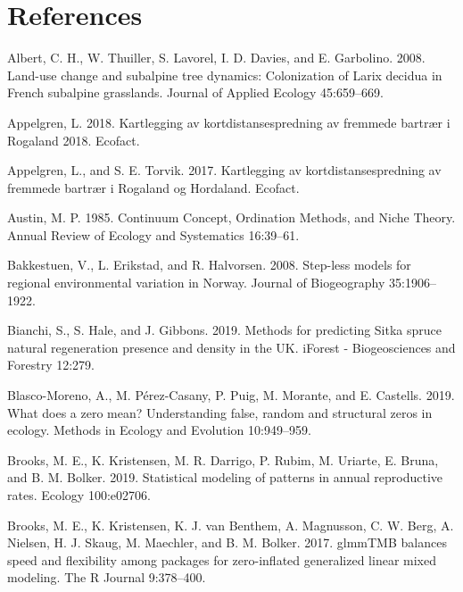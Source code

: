 \documentclass[
]{article}
\begin{document}
\hypertarget{references}{%
\section*{References}\label{references}}

\hypertarget{refs}{}
\leavevmode\hypertarget{ref-albertLanduseChangeSubalpine2008}{}%
Albert, C. H., W. Thuiller, S. Lavorel, I. D. Davies, and E. Garbolino. 2008. Land-use change and subalpine tree dynamics: Colonization of Larix decidua in French subalpine grasslands. Journal of Applied Ecology 45:659--669.

\leavevmode\hypertarget{ref-appelgrenKartleggingAvKortdistansespredning2018}{}%
Appelgren, L. 2018. Kartlegging av kortdistansespredning av fremmede bartrær i Rogaland 2018. Ecofact.

\leavevmode\hypertarget{ref-appelgrenKartleggingAvKortdistansespredning2017}{}%
Appelgren, L., and S. E. Torvik. 2017. Kartlegging av kortdistansespredning av fremmede bartrær i Rogaland og Hordaland. Ecofact.

\leavevmode\hypertarget{ref-austinContinuumConceptOrdination1985}{}%
Austin, M. P. 1985. Continuum Concept, Ordination Methods, and Niche Theory. Annual Review of Ecology and Systematics 16:39--61.

\leavevmode\hypertarget{ref-bakkestuenSteplessModelsRegional2008}{}%
Bakkestuen, V., L. Erikstad, and R. Halvorsen. 2008. Step-less models for regional environmental variation in Norway. Journal of Biogeography 35:1906--1922.

\leavevmode\hypertarget{ref-bianchiMethodsPredictingSitka2019}{}%
Bianchi, S., S. Hale, and J. Gibbons. 2019. Methods for predicting Sitka spruce natural regeneration presence and density in the UK. iForest - Biogeosciences and Forestry 12:279.

\leavevmode\hypertarget{ref-blasco-morenoWhatDoesZero2019}{}%
Blasco-Moreno, A., M. Pérez-Casany, P. Puig, M. Morante, and E. Castells. 2019. What does a zero mean? Understanding false, random and structural zeros in ecology. Methods in Ecology and Evolution 10:949--959.

\leavevmode\hypertarget{ref-brooksStatisticalModelingPatterns2019}{}%
Brooks, M. E., K. Kristensen, M. R. Darrigo, P. Rubim, M. Uriarte, E. Bruna, and B. M. Bolker. 2019. Statistical modeling of patterns in annual reproductive rates. Ecology 100:e02706.

\leavevmode\hypertarget{ref-brooksGlmmTMBBalancesSpeed2017}{}%
Brooks, M. E., K. Kristensen, K. J. van Benthem, A. Magnusson, C. W. Berg, A. Nielsen, H. J. Skaug, M. Maechler, and B. M. Bolker. 2017. glmmTMB balances speed and flexibility among packages for zero-inflated generalized linear mixed modeling. The R Journal 9:378--400.
\end{document}
